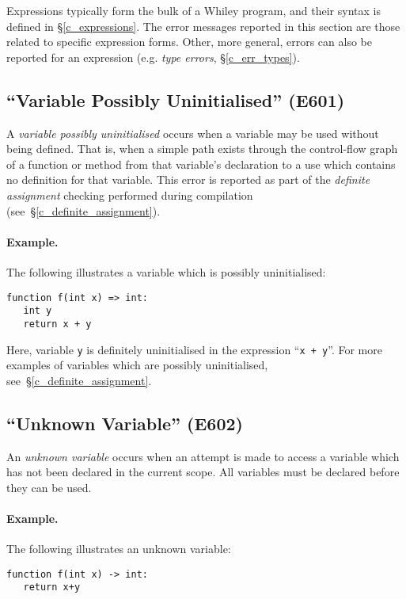 Expressions typically form the bulk of a Whiley program, and their syntax is defined in \S\ref{c_expressions}.  The error messages reported in this section are those related to specific expression forms.  Other, more general, errors can also be reported for an expression (e.g. {\em type errors}, \S\ref{c_err_types}).

\subsection{``Variable Possibly Uninitialised'' (E601)}
\label{c_err_var_uninitialised}
A {\em variable possibly uninitialised} occurs when a variable may be used without being defined.  That is, when a simple path exists through the control-flow graph of a function or method from that variable's declaration to a use which contains no definition for that variable.  This error is reported as part of the {\em definite assignment} checking performed during compilation (see~\S\ref{c_definite_assignment}).

\paragraph{Example.}  The following illustrates a variable which is possibly uninitialised:

\begin{lstlisting}
function f(int x) => int:
   int y
   return x + y
\end{lstlisting}

Here, variable \lstinline{y} is definitely uninitialised in the expression ``\lstinline{x + y}''.  For more examples of variables which are possibly uninitialised, see~\S\ref{c_definite_assignment}.

\subsection{``Unknown Variable'' (E602)}

An {\em unknown variable} occurs when an attempt is made to access a variable which has not been declared in the current scope.  All variables must be declared before they can be used.

\paragraph{Example.}  The following illustrates an unknown variable:

\begin{lstlisting}
function f(int x) -> int:
   return x+y
\end{lstlisting}

